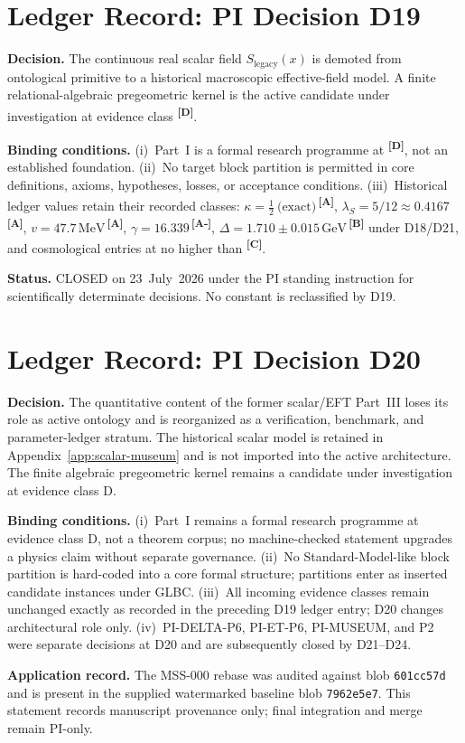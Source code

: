 \documentclass[12pt,a4paper,twoside]{article}
\theoremstyle{plain}
\theoremstyle{definition}
\theoremstyle{remark}
\newcommand{\GeV}{\,\mathrm{GeV}}
\newcommand{\MeV}{\,\mathrm{MeV}}
\newcommand{\catmark}[1]{\textsuperscript{\textsf{\textbf{[#1]}}}}
\newcommand{\LegacySx}{S_{\mathrm{legacy}}(x)} %
\newcommand{\Sx}{\LegacySx} %
\newcommand{\lambdaS}{5/12 \approx 0.4167} %
\newcommand{\DeltaGap}{1.710 \pm 0.015\GeV} %
\newcommand{\GammaGeom}{16.339} %
\newcommand{\vVEV}{47.7\MeV} %
\newcommand{\KappaRG}{\tfrac{1}{2}\ \text{(exact)}} %
\begin{document}
\section{Ledger Record: PI Decision D19}
\label{sec:d19-ledger-record}

\begin{pioverridebox}
\textbf{Decision.} The continuous real scalar field $\Sx$ is demoted from
ontological primitive to a historical macroscopic effective-field model. A
finite relational-algebraic pregeometric kernel is the active candidate under
investigation at evidence class \catmark{D}.

\textbf{Binding conditions.}
(i)~Part~I is a formal research programme at \catmark{D}, not an established
foundation.
(ii)~No target block partition is permitted in core definitions, axioms,
hypotheses, losses, or acceptance conditions.
(iii)~Historical ledger values retain their recorded classes:
$\kappa = \KappaRG$\,\catmark{A}, $\lambda_S = \lambdaS$\,\catmark{A},
$v = \vVEV$\,\catmark{A}, $\gamma = \GammaGeom$\,\catmark{A-},
$\Delta = \DeltaGap$\,\catmark{B} under D18/D21, and cosmological entries
at no higher than \catmark{C}.

\textbf{Status.} CLOSED on 23~July~2026 under the PI standing instruction for
scientifically determinate decisions. No constant is reclassified by D19.
\end{pioverridebox}

\section{Ledger Record: PI Decision D20}
\label{sec:d20-ledger-record}

\begin{pioverridebox}
\textbf{Decision.} The quantitative content of the former scalar/EFT Part~III
loses its role as active ontology and is reorganized as a verification,
benchmark, and parameter-ledger stratum. The historical scalar model is
retained in Appendix~\ref{app:scalar-museum} and is not imported into the
active architecture. The finite algebraic pregeometric kernel remains a
candidate under investigation at evidence class D.

\textbf{Binding conditions.}
(i)~Part~I remains a formal research programme at evidence class D, not a
theorem corpus; no machine-checked statement upgrades a physics claim without
separate governance.
(ii)~No Standard-Model-like block partition is hard-coded into a core formal
structure; partitions enter as inserted candidate instances under GLBC.
(iii)~All incoming evidence classes remain unchanged exactly as recorded in
the preceding D19 ledger entry; D20 changes architectural role only.
(iv)~PI-DELTA-P6, PI-ET-P6, PI-MUSEUM, and P2 were separate decisions at D20 and are subsequently closed by D21--D24.

\textbf{Application record.} The MSS-000 rebase was audited against blob
\texttt{601cc57d} and is present in the supplied watermarked baseline blob
\texttt{7962e5e7}. This statement records manuscript provenance only; final
integration and merge remain PI-only.
\end{pioverridebox}
\end{document}
